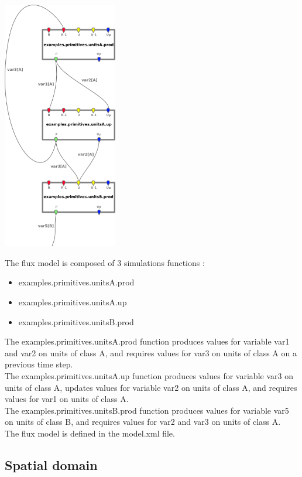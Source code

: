 \documentclass[a4paper,11pt]{article}
\begin{document}
\begin{floatingfigure}[r]{6cm}
\includegraphics[width=5cm]{openfluid-engine_example-primitives_en/model.png}
\end{floatingfigure}
The flux model is composed of 3 simulations functions :\\
\begin{itemize}
\item examples.primitives.unitsA.prod
\item examples.primitives.unitsA.up
\item examples.primitives.unitsB.prod
\end{itemize}
The examples.primitives.unitsA.prod function produces values for 
variable var1 and var2 on units of class A, and requires values for var3 on units of class A 
on a previous time step.\\
The examples.primitives.unitsA.up function produces values for variable var3 on units of class A, 
updates values for variable var2 on units of class A, and requires values for var1 on units of class A.\\
The examples.primitives.unitsB.prod function produces values for variable var5 on units of class B,
and requires values for var2 and var3 on units of class A.\\
The flux model is defined in the model.xml file.

\bigskip
\bigskip

\subsection{Spatial domain}
\end{document}
